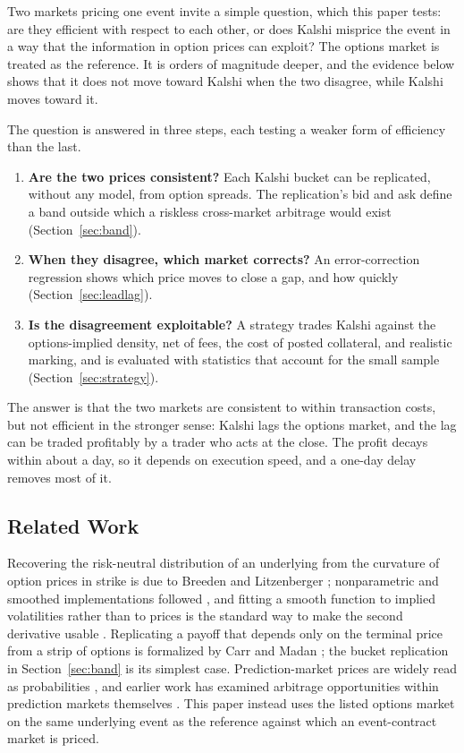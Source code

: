 \documentclass{article}
\begin{document}
Two markets pricing one event invite a simple question, which this paper tests: are they efficient with respect to each other, or does Kalshi misprice the event in a way that the information in option prices can exploit? The options market is treated as the reference. It is orders of magnitude deeper, and the evidence below shows that it does not move toward Kalshi when the two disagree, while Kalshi moves toward it.

The question is answered in three steps, each testing a weaker form of efficiency than the last.
\begin{enumerate}
  \item \textbf{Are the two prices consistent?} Each Kalshi bucket can be replicated, without any model, from option spreads. The replication's bid and ask define a band outside which a riskless cross-market arbitrage would exist (Section~\ref{sec:band}).
  \item \textbf{When they disagree, which market corrects?} An error-correction regression shows which price moves to close a gap, and how quickly (Section~\ref{sec:leadlag}).
  \item \textbf{Is the disagreement exploitable?} A strategy trades Kalshi against the options-implied density, net of fees, the cost of posted collateral, and realistic marking, and is evaluated with statistics that account for the small sample (Section~\ref{sec:strategy}).
\end{enumerate}

The answer is that the two markets are consistent to within transaction costs, but not efficient in the stronger sense: Kalshi lags the options market, and the lag can be traded profitably by a trader who acts at the close. The profit decays within about a day, so it depends on execution speed, and a one-day delay removes most of it.

\subsection{Related Work}
Recovering the risk-neutral distribution of an underlying from the curvature of option prices in strike is due to Breeden and Litzenberger \cite{Breeden1978}; nonparametric and smoothed implementations followed \cite{AitSahalia1995, Melick1997}, and fitting a smooth function to implied volatilities rather than to prices is the standard way to make the second derivative usable \cite{Dumas1998}. Replicating a payoff that depends only on the terminal price from a strip of options is formalized by Carr and Madan \cite{Carr2001}; the bucket replication in Section~\ref{sec:band} is its simplest case. Prediction-market prices are widely read as probabilities \cite{Wolfers2004}, and earlier work has examined arbitrage opportunities within prediction markets themselves \cite{Kildal2012, Cao2013}. This paper instead uses the listed options market on the same underlying event as the reference against which an event-contract market is priced.
\end{document}
